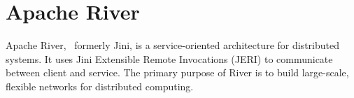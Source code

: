 \section{Apache River}

Apache River,~\cite{hid-sp18-www-526-apache-river} formerly
Jini, is a service-oriented architecture for distributed
systems. It uses Jini Extensible Remote Invocations (JERI)
to communicate between client and service. The primary 
purpose of River is to build large-scale, flexible networks
for distributed computing.

